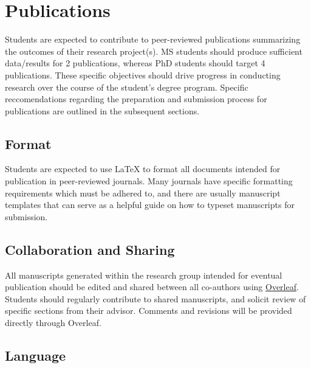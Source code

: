 \documentclass[12pt,a4paper,article,oneside]{memoir} %
\begin{document}

\section{Publications}

Students are expected to contribute to peer-reviewed publications summarizing the outcomes of their research project(s). MS students should produce sufficient data/results for 2 publications, whereas PhD students should target 4 publications. These specific objectives should drive progress in conducting research over the course of the student's degree program. Specific reccomendations regarding the preparation and submission process for publications are outlined in the subsequent sections.

\subsection{Format}

Students are expected to use \LaTeX{} to format all documents intended for publication in peer-reviewed journals. Many journals have specific formatting requirements which must be adhered to, and there are usually manuscript templates that can serve as a helpful guide on how to typeset manuscripts for submission.

\subsection{Collaboration and Sharing}

All manuscripts generated within the research group intended for eventual publication should be edited and shared between all co-authors using \href{https://www.overleaf.com/edu/okstate}{Overleaf}. Students should regularly contribute to shared manuscripts, and solicit review of specific sections from their advisor. Comments and revisions will be provided directly through Overleaf.

\subsection{Language}
\end{document}

